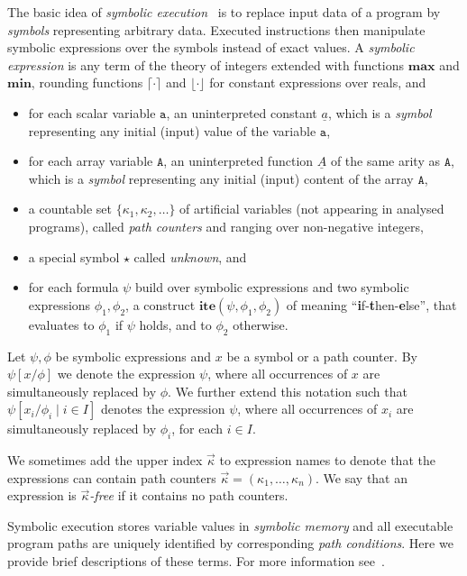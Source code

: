 \documentclass[10pt,a4paper]{article}
\newcommand{\var}[1]{\texttt{#1}}
\newcommand{\sym}[1]{\ensuremath{\underline{#1}}}
\newcommand{\ite}{\ensuremath{\mathbf{ite}}}
\newcommand{\maxim}{\ensuremath{\mathbf{max}}}
\newcommand{\minim}{\ensuremath{\mathbf{min}}}
\begin{document}
The basic idea of \emph{symbolic execution}~\cite{Kin76} is to replace
input data of a program by \emph{symbols} representing arbitrary
data. Executed instructions then manipulate symbolic expressions over
the symbols instead of exact values. A \emph{symbolic expression} is
any term of the theory of integers extended with functions
$\maxim$ and $\minim$, rounding functions $ \lceil\cdot\rceil $ and
$ \lfloor\cdot\rfloor $ for constant expressions over reals, and
\begin{itemize}
\item for each scalar variable $\var{a}$, an uninterpreted constant
  $\sym{a}$, which is a \emph{symbol} representing any initial
  (input) value of the variable $\var{a}$,
\item for each array variable $\var{A}$, an uninterpreted function $\sym{A}$
  of the same arity as $\var{A}$, which is a \emph{symbol} representing any
  initial (input) content of the array $\var{A}$,
\item a countable set $\{\kappa_1,\kappa_2,\ldots\}$ of artificial variables (not appearing in analysed programs), called
  \emph{path counters} and ranging over non-negative integers,
\item a special symbol $\star$ called \emph{unknown}, and
\item for each formula $\psi$ build over symbolic expressions and two
  symbolic expressions $\phi_1,\phi_2$, a construct $\ite(\psi,\phi_1,\phi_2)$
  of meaning ``\textbf{i}f-\textbf{t}hen-\textbf{e}lse'', that evaluates to
  $\phi_1$ if $\psi$ holds, and to $\phi_2$ otherwise.
\end{itemize}

Let $\psi,\phi$ be symbolic expressions and $x$ be a symbol or a path
counter. By $\psi[x/\phi]$ we denote the expression $\psi$, where all
occurrences of $x$ are simultaneously replaced by $\phi$. We further extend
this notation such that $\psi[x_i/\phi_i\mid i \in I]$ denotes the
expression $\psi$, where all occurrences of $x_i$ are simultaneously
replaced by $\phi_i$, for each $i \in I$. 

We sometimes add the upper index $\vec{\kappa}$ to expression names to
denote that the expressions can contain path counters $\vec{\kappa} =
(\kappa_1,\ldots,\kappa_n)$. We say that an expression is
\emph{$\vec{\kappa}$-free} if it contains no path counters.

Symbolic execution stores variable values in \emph{symbolic memory} and all
executable program paths are uniquely identified by corresponding \emph{path
  conditions}. Here we provide brief descriptions of these
terms. For more information see~\cite{Kin76}.
\end{document}
